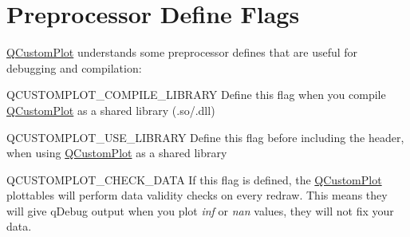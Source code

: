 \hypertarget{index_mainpage-flags}{}\section{Preprocessor Define Flags}\label{index_mainpage-flags}
\hyperlink{class_q_custom_plot}{Q\-Custom\-Plot} understands some preprocessor defines that are useful for debugging and compilation\-: 
\begin{DoxyDescription}
\item[{\ttfamily Q\-C\-U\-S\-T\-O\-M\-P\-L\-O\-T\-\_\-\-C\-O\-M\-P\-I\-L\-E\-\_\-\-L\-I\-B\-R\-A\-R\-Y} ]Define this flag when you compile \hyperlink{class_q_custom_plot}{Q\-Custom\-Plot} as a shared library (.so/.dll) 
\item[{\ttfamily Q\-C\-U\-S\-T\-O\-M\-P\-L\-O\-T\-\_\-\-U\-S\-E\-\_\-\-L\-I\-B\-R\-A\-R\-Y} ]Define this flag before including the header, when using \hyperlink{class_q_custom_plot}{Q\-Custom\-Plot} as a shared library 
\item[{\ttfamily Q\-C\-U\-S\-T\-O\-M\-P\-L\-O\-T\-\_\-\-C\-H\-E\-C\-K\-\_\-\-D\-A\-T\-A} ]If this flag is defined, the \hyperlink{class_q_custom_plot}{Q\-Custom\-Plot} plottables will perform data validity checks on every redraw. This means they will give q\-Debug output when you plot {\itshape inf} or {\itshape nan} values, they will not fix your data. 
\end{DoxyDescription}